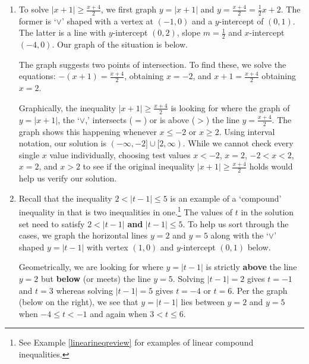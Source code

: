 \documentclass{ximera}
\begin{document}
\begin{example}
\begin{enumerate}
\item  To solve $|x+1|\geq \frac{x+4}{2}$, we first graph $y = |x+1|$ and $y = \frac{x+4}{2} = \frac{1}{2} x + 2$.  The former is `$\vee$' shaped with a vertex at $(-1,0)$ and a $y$-intercept of $(0,1)$.  The latter is a line with $y$-intercept $(0,2)$, slope $m = \frac{1}{2}$ and $x$-intercept $(-4,0)$.  Our graph of the situation is below.


\begin{center}
\end{center}


  The graph suggests two points of intersection.  To find these, we solve the equations: $-(x+1) =  \frac{x+4}{2}$, obtaining $x = -2$,  and $x+1 = \frac{x+4}{2}$ obtaining $x = 2$.

\medskip

Graphically, the inequality  $|x+1|\geq \frac{x+4}{2}$ is looking for where the graph of $y = |x+1|$,  the `$\vee$,' intersects ($=$) or is above ($>$) the line  $y = \frac{x+4}{2}$.  The graph shows this happening whenever $x \leq -2$ or $x \geq 2$.  Using interval notation, our solution is $(-\infty, -2] \cup [2, \infty)$.  While we cannot check every single $x$ value individually, choosing test values $x < -2$, $x = 2$, $-2 < x < 2$, $x = 2$, and $x > 2$ to see if the original inequality  $|x+1|\geq \frac{x+4}{2}$ holds would help us verify our solution.



\item  Recall that the inequality $2 < |t-1| \leq 5$ is an example of a `compound' inequality in that is two inequalities in one.\footnote{See Example \ref{linearineqreview} for examples of linear compound inequalities.}  The values of $t$ in the solution set need to satisfy $2 < |t-1|$ \textbf{and} $|t-1| \leq 5$.  To help us sort through the cases, we graph the horizontal lines $y =2$ and $y = 5$ along with the `$\vee$' shaped $y= |t-1|$ with vertex $(1,0)$ and $y$-intercept $(0,1)$ below. 


\begin{center}
\end{center}

Geometrically, we are looking for where $y = |t-1|$ is strictly \textbf{above} the line $y = 2$ but \textbf{below} (or meets)  the line $y = 5$.  Solving $|t-1| = 2$ gives $t = -1$ and $t = 3$ whereas solving $|t-1| = 5$ gives $t = -4$ or $t = 6$. Per the graph (below on the right), we see that $y = |t-1|$ lies between $y=2$ and $y=5$ when $-4 \leq t < -1$ and again when $3 < t \leq 6$. 


\end{enumerate}
\end{example}
\end{document}
